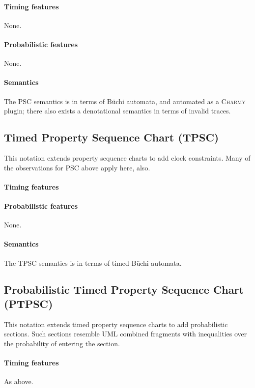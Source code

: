 \paragraph{Timing features}
None.

\paragraph{Probabilistic features}
None.

\paragraph{Semantics}
The PSC semantics is in terms of B\"uchi automata, and automated as a
\textsc{Charmy} plugin; there also exists a denotational semantics in terms of
invalid traces.

\subsection{Timed Property Sequence Chart (TPSC)}
This notation extends property sequence charts to add clock constraints.  Many
of the observations for PSC above apply here, also.

\paragraph{Timing features}

\paragraph{Probabilistic features}
None.

\paragraph{Semantics}
The TPSC semantics is in terms of timed B\"uchi automata.

\subsection{Probabilistic Timed Property Sequence Chart (PTPSC)}
This notation extends timed property sequence charts to add probabilistic
sections.  Such sections resemble UML combined fragments with inequalities over
the probability of entering the section.

\paragraph{Timing features}
As above.

